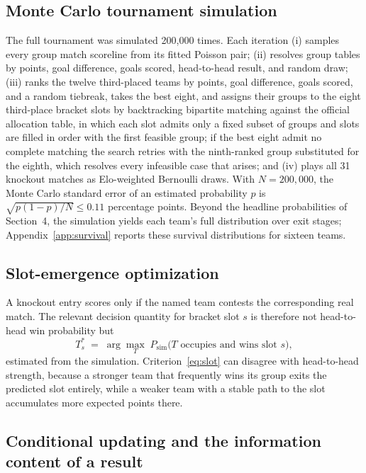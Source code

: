 \documentclass[11pt,letterpaper]{article}
\begin{document}
\subsection{Monte Carlo tournament simulation}

The full tournament was simulated 200{,}000 times. Each iteration (i) samples every group match scoreline from its fitted Poisson pair; (ii) resolves group tables by points, goal difference, goals scored, head-to-head result, and random draw; (iii) ranks the twelve third-placed teams by points, goal difference, goals scored, and a random tiebreak, takes the best eight, and assigns their groups to the eight third-place bracket slots by backtracking bipartite matching against the official allocation table, in which each slot admits only a fixed subset of groups and slots are filled in order with the first feasible group; if the best eight admit no complete matching the search retries with the ninth-ranked group substituted for the eighth, which resolves every infeasible case that arises; and (iv) plays all 31 knockout matches as Elo-weighted Bernoulli draws. With $N = 200{,}000$, the Monte Carlo standard error of an estimated probability $p$ is $\sqrt{p(1-p)/N} \le 0.11$ percentage points. Beyond the headline probabilities of Section~4, the simulation yields each team's full distribution over exit stages; Appendix~\ref{app:survival} reports these survival distributions for sixteen teams.

\subsection{Slot-emergence optimization}\label{sec:slot}

A knockout entry scores only if the named team contests the corresponding real match. The relevant decision quantity for bracket slot $s$ is therefore not head-to-head win probability but
\begin{equation}
T^\ast_s \;=\; \arg\max_T \; P_{\mathrm{sim}}\bigl(T \text{ occupies and wins slot } s\bigr),
\label{eq:slot}
\end{equation}
estimated from the simulation. Criterion~\eqref{eq:slot} can disagree with head-to-head strength, because a stronger team that frequently wins its group exits the predicted slot entirely, while a weaker team with a stable path to the slot accumulates more expected points there.

\subsection{Conditional updating and the information content of a result}\label{sec:updating}
\end{document}
